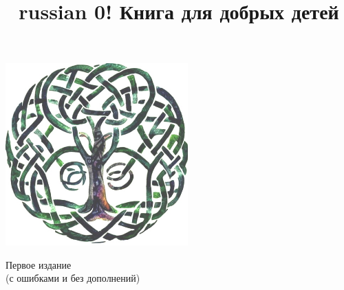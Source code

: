 \documentclass[a5paper,11pt]{memoir}
\title{\begin{otherlanguage*}{russian}
0! Книга для добрых детей
\end{otherlanguage*}}
\author{}
\begin{document}

\date{} %
\maketitle
\begin{center}
\includegraphics[height=7cm]{images/tree-cover} 

\vspace{4cm}
\tiny{
Первое издание\\
(с ошибками и без дополнений)
}
\end{center}


\thispagestyle{empty}
\newpage
\thispagestyle{empty}  %


\clearpage
\hfill

\end{document}
